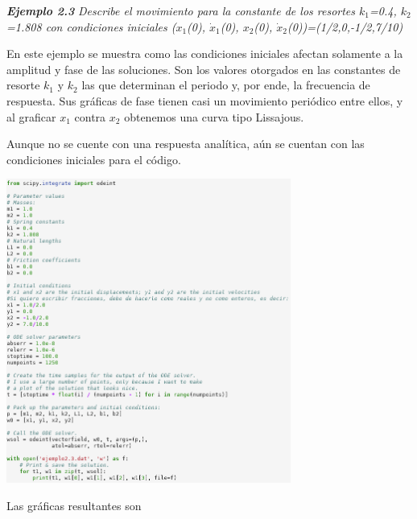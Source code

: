 \documentclass{article}
\begin{document}
\textbf{\textit{Ejemplo 2.3}}
\textit{Describe el movimiento para la constante de los resortes $k_1$=0.4, $k_2$=1.808 con condiciones iniciales ($x_1$(0), $\dot{x}_1$(0), $x_2$(0), $\dot{x}_2$(0))=(1/2,0,-1/2,7/10)}

En este ejemplo se muestra como las condiciones iniciales afectan solamente a la amplitud y fase de las soluciones. Son los valores otorgados en las constantes de resorte $k_1$ y $k_2$ las que determinan el periodo y, por ende, la frecuencia de respuesta. Sus gráficas de fase tienen casi un movimiento periódico entre ellos, y al graficar $x_1$ contra $x_2$ obtenemos una curva tipo Lissajous.

Aunque no se cuente con una respuesta analítica, aún se cuentan con las condiciones iniciales para el código.

    \begin{center}
    \includegraphics[height=10cm]{point23.png}
    \end{center} 

Las gráficas resultantes son
\end{document}
